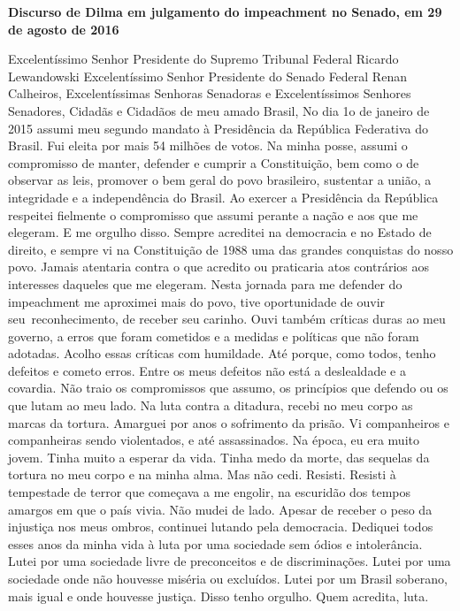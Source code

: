 \textbf{Discurso de Dilma em julgamento do impeachment no Senado, em 29
de agosto de 2016}

Excelentíssimo Senhor Presidente do Supremo Tribunal Federal Ricardo
Lewandowski Excelentíssimo Senhor Presidente do Senado Federal Renan
Calheiros, Excelentíssimas Senhoras Senadoras e Excelentíssimos Senhores
Senadores, Cidadãs e Cidadãos de meu amado Brasil, No dia 1o de janeiro
de 2015 assumi meu segundo mandato à Presidência da República Federativa
do Brasil. Fui eleita por mais 54 milhões de votos. Na minha posse,
assumi o compromisso de manter, defender e cumprir a Constituição, bem
como o de observar as leis, promover o bem geral do povo brasileiro,
sustentar a união, a integridade e a independência do Brasil. Ao exercer
a Presidência da República respeitei fielmente o compromisso que assumi
perante a nação e aos que me elegeram. E me orgulho disso. Sempre
acreditei na democracia e no Estado de direito, e sempre vi na
Constituição de 1988 uma das grandes conquistas do nosso povo. Jamais
atentaria contra o que acredito ou praticaria atos contrários aos
interesses daqueles que me elegeram. Nesta jornada para me defender do
impeachment me aproximei mais do povo, tive oportunidade de ouvir
seu~reconhecimento, de receber seu carinho. Ouvi também críticas duras
ao meu governo, a erros que foram cometidos e a medidas e políticas que
não foram adotadas. Acolho essas críticas com humildade. Até porque,
como todos, tenho defeitos e cometo erros. Entre os meus defeitos não
está a deslealdade e a covardia. Não traio os compromissos que assumo,
os princípios que defendo ou os que lutam ao meu lado. Na luta contra a
ditadura, recebi no meu corpo as marcas da tortura. Amarguei por anos o
sofrimento da prisão. Vi companheiros e companheiras sendo violentados,
e até assassinados. Na época, eu era muito jovem. Tinha muito a esperar
da vida. Tinha medo da morte, das sequelas da tortura no meu corpo e na
minha alma. Mas não cedi. Resisti. Resisti à tempestade de terror que
começava a me engolir, na escuridão dos tempos amargos em que o país
vivia. Não mudei de lado. Apesar de receber o peso da injustiça nos meus
ombros, continuei lutando pela democracia. Dediquei todos esses anos da
minha vida à luta por uma sociedade sem ódios e intolerância. Lutei por
uma sociedade livre de preconceitos e de discriminações. Lutei por uma
sociedade onde não houvesse miséria ou excluídos. Lutei por um Brasil
soberano, mais igual e onde houvesse justiça. Disso tenho orgulho. Quem
acredita, luta.

